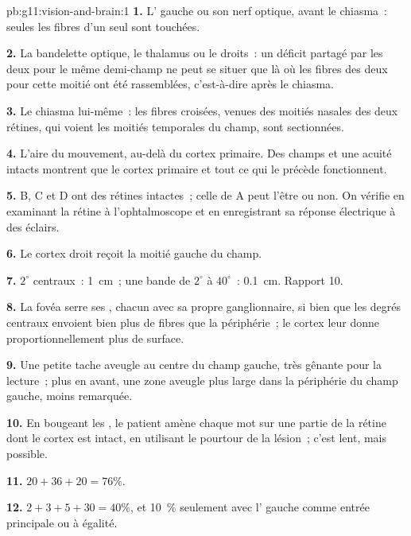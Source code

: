 \begin{solution}{pb:g11:vision-and-brain:1}
\textbf{1.} L' gauche ou son nerf optique, avant le chiasma~: seules
les fibres d'un seul  sont touchées.

\textbf{2.} La bandelette optique, le thalamus ou le 
droits~: un déficit partagé par les deux  pour le même demi-champ
ne peut se situer que là où les fibres des deux  pour cette moitié
ont été rassemblées, c'est-à-dire après le chiasma.

\textbf{3.} Le chiasma lui-même~: les fibres croisées, venues des
moitiés nasales des deux rétines, qui voient les moitiés temporales du
champ, sont sectionnées.

\textbf{4.} L'aire du mouvement, au-delà du cortex primaire. Des champs
et une acuité intacts montrent que le cortex primaire et tout ce qui le
précède fonctionnent.

\textbf{5.} B, C et D ont des rétines intactes~; celle de A peut l'être
ou non. On vérifie en examinant la rétine à l'ophtalmoscope et en
enregistrant sa réponse électrique à des éclairs.

\textbf{6.} Le cortex droit reçoit la moitié gauche du champ.

\textbf{7.} $2^\circ$ centraux~: \qty{1}{cm}~; une bande de $2^\circ$
à $40^\circ$~: \qty{0.1}{cm}. Rapport 10.

\textbf{8.} La fovéa serre ses , chacun avec sa propre 
ganglionnaire, si bien que les degrés centraux envoient bien plus de
fibres que la périphérie~; le cortex leur donne proportionnellement
plus de surface.

\textbf{9.} Une petite tache aveugle au centre du champ gauche, très
gênante pour la lecture~; plus en avant, une zone aveugle plus large
dans la périphérie du champ gauche, moins remarquée.

\textbf{10.} En bougeant les , le patient amène chaque mot sur une
partie de la rétine dont le cortex est intact, en utilisant le pourtour
de la lésion~; c'est lent, mais possible.

\textbf{11.} $20 + 36 + 20 = 76\%$.

\textbf{12.} $2 + 3 + 5 + 30 = 40\%$, et 10~\% seulement avec l'
gauche comme entrée principale ou à égalité.


\end{solution}
